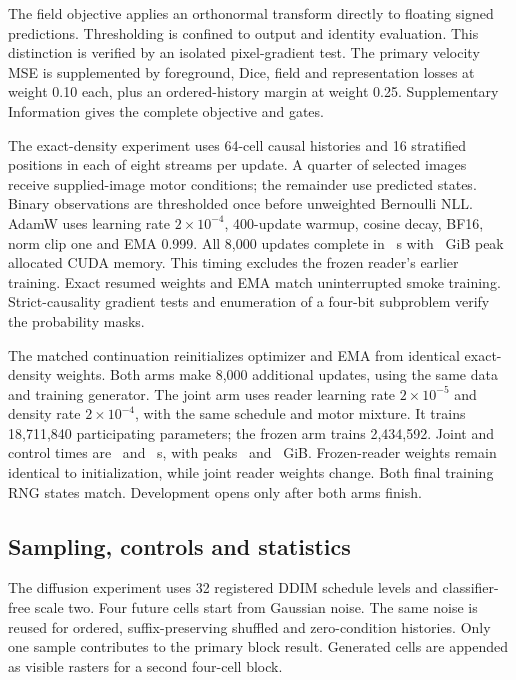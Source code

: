 The field objective applies an orthonormal transform directly to floating
signed predictions. Thresholding is confined to output and identity
evaluation. This distinction is verified by an isolated pixel-gradient test.
The primary velocity MSE is supplemented by foreground, Dice, field and
representation losses at weight 0.10 each, plus an ordered-history margin at
weight 0.25. Supplementary Information gives the complete objective and gates.

The exact-density experiment uses 64-cell causal histories and 16 stratified
positions in each of eight streams per update. A quarter of selected images
receive supplied-image motor conditions; the remainder use predicted states.
Binary observations are thresholded once before unweighted Bernoulli NLL.
AdamW uses learning rate $2\times10^{-4}$, 400-update warmup, cosine decay,
BF16, norm clip one and EMA 0.999. All 8,000 updates complete in
\DensitySeconds\ s with \DensityMemory\ GiB peak allocated CUDA memory.
This timing excludes the frozen reader's earlier training. Exact resumed
weights and EMA match uninterrupted smoke training. Strict-causality gradient
tests and enumeration of a four-bit subproblem verify the probability masks.

The matched continuation reinitializes optimizer and EMA from identical
exact-density weights. Both arms make 8,000 additional updates, using the same
data and training generator. The joint arm uses reader learning rate
$2\times10^{-5}$ and density rate $2\times10^{-4}$, with the same schedule and
motor mixture. It trains 18,711,840 participating parameters; the frozen arm
trains 2,434,592. Joint and control times are \JointTime\ and \ControlTime\ s,
with peaks \JointMemory\ and \ControlMemory\ GiB. Frozen-reader weights remain
identical to initialization, while joint reader weights change. Both final
training RNG states match. Development opens only after both arms finish.

\subsection*{Sampling, controls and statistics}
The diffusion experiment uses 32 registered DDIM schedule levels and classifier-free scale
two. Four future cells start from Gaussian noise. The same noise is reused for
ordered, suffix-preserving shuffled and zero-condition histories. Only one
sample contributes to the primary block result. Generated cells are appended
as visible rasters for a second four-cell block.

